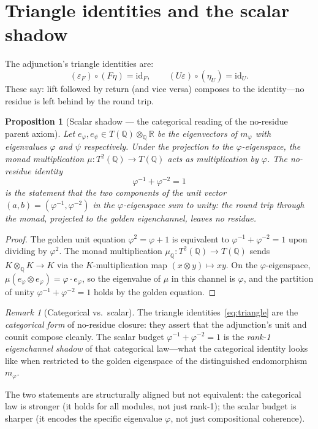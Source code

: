 \documentclass[11pt,a4paper]{article}
\theoremstyle{plain}
\newtheorem{proposition}[theorem]{Proposition}
\theoremstyle{definition}
\theoremstyle{remark}
\newtheorem{remark}[theorem]{Remark}
\numberwithin{equation}{section}
\providecommand{\R}{\mathbb{R}}
\providecommand{\Q}{\mathbb{Q}}
\providecommand{\vp}{\varphi}
\providecommand{\ps}{\psi}
\providecommand{\id}{\mathrm{id}}
\begin{document}
\section{Triangle identities and the scalar shadow}
\label{sec:triangle}

The adjunction's triangle identities are:
\begin{equation}
\label{eq:triangle}
  (\varepsilon_F) \circ (F\eta) = \id_F,
  \qquad
  (U\varepsilon) \circ (\eta_U) = \id_U.
\end{equation}
These say: lift followed by return (and vice versa) composes to
the identity---no residue is left behind by the round trip.

\begin{keyresultbox}
\begin{proposition}[Scalar shadow --- the categorical reading of the no-residue parent axiom]
\label{prop:shadow}
Let $e_\vp, e_\ps \in T(\Q) \otimes_\Q \R$ be the eigenvectors of
$m_\vp$ with eigenvalues $\vp$ and $\ps$ respectively.  Under the
projection to the $\vp$-eigenspace, the monad multiplication
$\mu \colon T^2(\Q) \to T(\Q)$ acts as multiplication by $\vp$.
The no-residue identity
\[
  \vp^{-1} + \vp^{-2} = 1
\]
is the statement that the two components of the unit vector
$(a, b) = (\vp^{-1}, \vp^{-2})$ in the $\vp$-eigenspace sum to
unity: the round trip through the monad, projected to the
golden eigenchannel, leaves no residue.
\end{proposition}

\begin{proof}
The golden unit equation $\vp^2 = \vp + 1$ is equivalent to
$\vp^{-1} + \vp^{-2} = 1$ upon dividing by $\vp^2$.  The
monad multiplication $\mu_\Q \colon T^2(\Q) \to T(\Q)$ sends
$K \otimes_\Q K \to K$ via the $K$-multiplication map
$(x \otimes y) \mapsto xy$.  On the $\vp$-eigenspace,
$\mu(e_\vp \otimes e_\vp) = \vp \cdot e_\vp$, so the
eigenvalue of $\mu$ in this channel is $\vp$, and the partition
of unity $\vp^{-1} + \vp^{-2} = 1$ holds by the golden equation.
\end{proof}
\end{keyresultbox}

\begin{remark}[Categorical vs.\ scalar]
\label{rmk:categorical-vs-scalar}
The triangle identities~\eqref{eq:triangle} are the
\emph{categorical form} of no-residue closure: they assert that
the adjunction's unit and counit compose cleanly.  The scalar
budget $\vp^{-1} + \vp^{-2} = 1$ is the \emph{rank-1
eigenchannel shadow} of that categorical law---what the
categorical identity looks like when restricted to the golden
eigenspace of the distinguished endomorphism $m_\vp$.

The two statements are structurally aligned but not equivalent:
the categorical law is stronger (it holds for all modules, not
just rank-1); the scalar budget is sharper (it encodes the
specific eigenvalue $\vp$, not just compositional coherence).
\end{remark}
\end{document}
